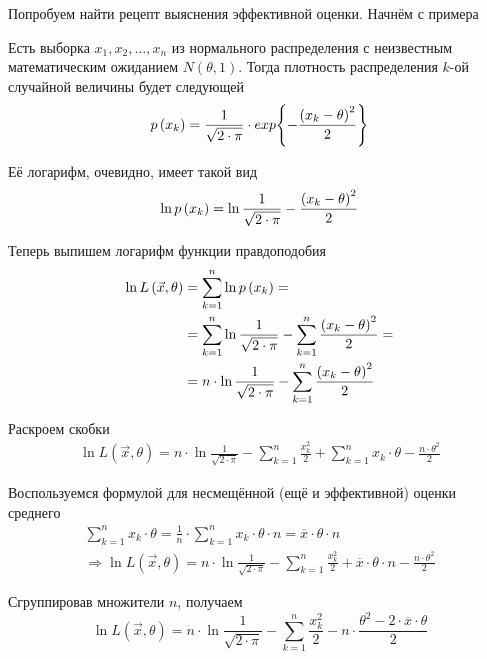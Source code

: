Попробуем найти рецепт выяснения эффективной оценки. Начнём с примера
\begin{example}
    Есть выборка $x_1, x_2, \dots, x_n$ из нормального распределения
    с неизвестным математическим ожиданием $N\left( \theta,1 \right)$.
    Тогда плотность распределения $k$-ой случайной величины будет следующей
    $$p\left(x_k\right)
        =\frac{1}{\sqrt{2\cdot\pi}}
            \cdot exp{\left\{-\frac{\left(x_k-\theta\right)^2}{2}\right\}}$$

    Её логарифм, очевидно, имеет такой вид
    $$\ln{p\left(x_k\right)}
        =\ln{\frac{1}{\sqrt{2\cdot\pi}}}
            -\frac{\left(x_k-\theta\right)^2}{2}$$

    Теперь выпишем логарифм функции правдоподобия
    \begin{align*}
        \ln{L\left( \vec{x},\theta \right)}
        &=\sum_{k=1}^n \ln{p\left(x_k\right)}=\\
        &=\sum_{k=1}^n \ln{\frac{1}{\sqrt{2\cdot\pi}}}
            -\sum_{k=1}^n \frac{\left(x_k-\theta\right)^2}{2}=\\
        &=n\cdot\ln{\frac{1}{\sqrt{2\cdot\pi}}}
            -\sum_{k=1}^n \frac{\left(x_k-\theta\right)^2}{2}
    \end{align*}

    Раскроем скобки
    \begin{align*}
        \ln{L\left( \vec{x},\theta \right)}
        =n\cdot\ln{\frac{1}{\sqrt{2\cdot\pi}}}
            -\sum_{k=1}^n \frac{x_k^2}{2}
            +\sum_{k=1}^n x_k\cdot\theta
            -\frac{n\cdot\theta^2}{2}
    \end{align*}

    Воспользуемся формулой для несмещённой (ещё и эффективной) оценки среднего
    \begin{align*}
        \sum_{k=1}^n x_k\cdot\theta
            =\frac{1}{n}\cdot\sum_{k=1}^n x_k\cdot\theta\cdot n
            =\overline{x}\cdot\theta\cdot n\\
        \Rightarrow\ln{L\left( \vec{x},\theta \right)}
        =n\cdot\ln{\frac{1}{\sqrt{2\cdot\pi}}}
            -\sum_{k=1}^n \frac{x_k^2}{2}
            +\overline{x}\cdot\theta\cdot n
            -\frac{n\cdot\theta^2}{2}
    \end{align*}

    Сгруппировав множители $n$, получаем
    $$\ln{L\left( \vec{x},\theta \right)}
        =n\cdot\ln{\frac{1}{\sqrt{2\cdot\pi}}}
            -\sum_{k=1}^n \frac{x_k^2}{2}
            -n\cdot\frac{\theta^2
                -2\cdot\overline{x}\cdot\theta}{2}$$


\end{example}
